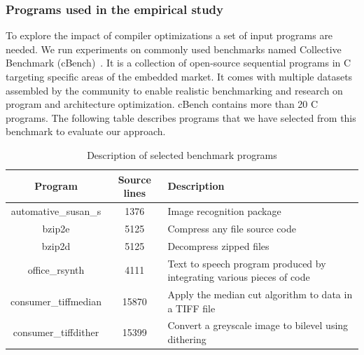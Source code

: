 \subsubsection{Programs used in the empirical study}
To explore the impact of compiler optimizations a set of input programs are needed. We run experiments on commonly used benchmarks named Collective Benchmark (cBench)~\cite{fursin2009collective}. It is a collection of open-source sequential programs in C targeting specific areas of the embedded market. It comes with multiple datasets assembled by the community to enable realistic benchmarking and research on program and architecture optimization. cBench contains more than 20 C programs. The following table describes programs that we have selected from this benchmark to evaluate our approach.
\begin{table}[h]
	\begin{center}
		\begin{tabular}{|c|c|p{3.9cm}|}
			\hline
			\textbf{Program} & \textbf{Source lines} & \textbf{Description}\\
			\hline
			automative\_susan\_s & 1376 & Image recognition package\\
			\hline
			bzip2e & 5125 & Compress any file
			source code \\
			\hline
			bzip2d & 5125 & Decompress zipped files \\
			\hline
			office\_rsynth & 4111 & Text to speech program produced by integrating various pieces of code\\
			\hline
			consumer\_tiffmedian& 15870 & Apply the median cut algorithm to data in a TIFF file
			\\
			
			\hline
			consumer\_tiffdither& 15399 & Convert a greyscale image to bilevel using dithering
			\\
			\hline
			
		\end{tabular}
		
	\end{center}
	\caption {Description of selected benchmark programs}
\end{table}

